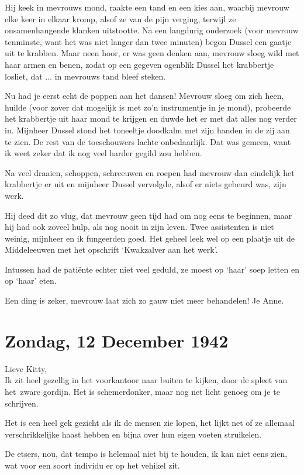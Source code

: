 \documentclass{book}
\begin{document}
Hij keek in mevrouws mond, raakte een tand en een kies aan, waarbij
mevrouw elke keer in elkaar kromp, alsof ze van de pijn verging, terwijl
ze onsamenhangende klanken uitstootte. Na een langdurig onderzoek (voor
mevrouw tenminste, want het was niet langer dan twee minuten) begon
Dussel een gaatje uit te krabben. Maar neen hoor, er was geen denken
aan, mevrouw sloeg wild met haar armen en benen, zodat op een gegeven
ogenblik Dussel het krabbertje losliet, dat ... in mevrouws tand bleef
steken.

Nu had je eerst echt de poppen aan het dansen! Mevrouw sloeg om zich
heen, huilde (voor zover dat mogelijk is met zo'n instrumentje in je
mond), probeerde het krabbertje uit haar mond te krijgen en duwde het er
met dat alles nog verder in. Mijnheer Dussel stond het toneeltje
doodkalm met zijn handen in de zij aan te zien. De rest van de
toeschouwers lachte onbedaarlijk. Dat was gemeen, want ik weet zeker dat
ik nog veel harder gegild zou hebben.

Na veel draaien, schoppen, schreeuwen en roepen had mevrouw dan
eindelijk het krabbertje er uit en mijnheer Dussel vervolgde, alsof er
niets gebeurd was, zijn werk.

Hij deed dit zo vlug, dat mevrouw geen tijd had om nog eens te beginnen,
maar hij had ook zoveel hulp, als nog nooit in zijn leven. Twee
assistenten is niet weinig, mijnheer en ik fungeerden goed. Het geheel
leek wel op een plaatje uit de Middeleeuwen met het opschrift
`Kwakzalver aan het werk'.

Intussen had de patiënte echter niet veel geduld, ze moest op `haar'
soep letten en op `haar' eten.

Een ding is zeker, mevrouw laat zich zo gauw niet meer behandelen! Je
Anne.

\chapter{Zondag, 12 December 1942}

Lieve Kitty,\\Ik zit heel gezellig in het voorkantoor naar buiten te
kijken, door de spleet van het~zware gordijn. Het is schemerdonker, maar
nog net licht genoeg om je te schrijven.

Het is een heel gek gezicht als ik de mensen zie lopen, het lijkt net of
ze allemaal verschrikkelijke haast hebben en bijna over hun eigen voeten
struikelen.

De etsers, nou, dat tempo is helemaal niet bij te houden, ik kan niet
eens zien, wat voor een soort individu er op het vehikel zit.
\end{document}
